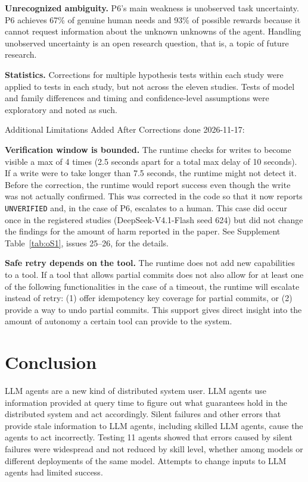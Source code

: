 \documentclass[letterpaper,twocolumn,10pt]{article}
\begin{document}
\textbf{Unrecognized ambiguity.} P6's main weakness is unobserved task uncertainty. P6 achieves 67\% of genuine human needs and 93\% of possible rewards because it cannot request information about the unknown unknowns of the agent. Handling unobserved uncertainty is an open research question, that is, a topic of future research.

\textbf{Statistics.} Corrections for multiple hypothesis tests within each study were applied to tests in each study, but not across the eleven studies. Tests of model and family differences and timing and confidence-level assumptions were exploratory and noted as such.

Additional Limitations Added After Corrections done 2026-11-17:

\textbf{Verification window is bounded.} The runtime checks for writes to become visible a max of 4 times (2.5 seconds apart for a total max delay of 10 seconds). If a write were to take longer than 7.5 seconds, the runtime might not detect it. Before the correction, the runtime would report success even though the write was not actually confirmed. This was corrected in the code so that it now reports \texttt{UNVERIFIED} and, in the case of P6, escalates to a human. This case did occur once in the registered studies (DeepSeek-V4.1-Flash seed 624) but did not change the findings for the amount of harm reported in the paper. See Supplement Table~\ref{tab:oS1}, issues 25--26, for the details.

\textbf{Safe retry depends on the tool.} The runtime does not add new capabilities to a tool. If a tool that allows partial commits does not also allow for at least one of the following functionalities in the case of a timeout, the runtime will escalate instead of retry: (1) offer idempotency key coverage for partial commits, or (2) provide a way to undo partial commits. This support gives direct insight into the amount of autonomy a certain tool can provide to the system.

\section{Conclusion}\label{sec:10}

LLM agents are a new kind of distributed system user. LLM agents use information provided at query time to figure out what guarantees hold in the distributed system and act accordingly. Silent failures and other errors that provide stale information to LLM agents, including skilled LLM agents, cause the agents to act incorrectly. Testing 11 agents showed that errors caused by silent failures were widespread and not reduced by skill level, whether among models or different deployments of the same model. Attempts to change inputs to LLM agents had limited success.
\end{document}
